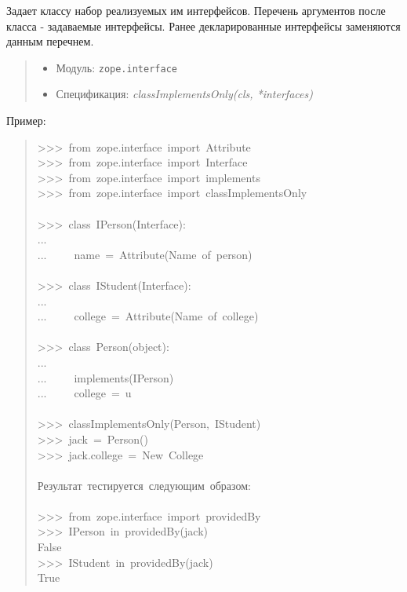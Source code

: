 \documentclass[a4paper,openany,twoside,final]{book}
\providecommand*{\DUroletitlereference}[1]{\textsl{#1}}
\begin{document}
Задает классу набор реализуемых им интерфейсов.  Перечень аргументов
после класса - задаваемые интерфейсы.  Ранее декларированные
интерфейсы заменяются данным перечнем.

\begin{quote}

\begin{itemize}

\item Модуль: \texttt{zope.interface}

\item Спецификация: \DUroletitlereference{classImplementsOnly(cls, *interfaces)}

\end{itemize}

\end{quote}

Пример:

\begin{quote}{\ttfamily \raggedright \noindent
>{}>{}>~from~zope.interface~import~Attribute\\
>{}>{}>~from~zope.interface~import~Interface\\
>{}>{}>~from~zope.interface~import~implements\\
>{}>{}>~from~zope.interface~import~classImplementsOnly\\
~\\
>{}>{}>~class~IPerson(Interface):\\
...\\
...~~~~~name~=~Attribute(\textquotedbl{}Name~of~person\textquotedbl{})\\
~\\
>{}>{}>~class~IStudent(Interface):\\
...\\
...~~~~~college~=~Attribute(\textquotedbl{}Name~of~college\textquotedbl{})\\
~\\
>{}>{}>~class~Person(object):\\
...\\
...~~~~~implements(IPerson)\\
...~~~~~college~=~u\textquotedbl{}\textquotedbl{}\\
~\\
>{}>{}>~classImplementsOnly(Person,~IStudent)\\
>{}>{}>~jack~=~Person()\\
>{}>{}>~jack.college~=~\textquotedbl{}New~College\textquotedbl{}\\
~\\
Результат~тестируется~следующим~образом:\\
~\\
>{}>{}>~from~zope.interface~import~providedBy\\
>{}>{}>~IPerson~in~providedBy(jack)\\
False\\
>{}>{}>~IStudent~in~providedBy(jack)\\
True
}
\end{quote}
\end{document}
